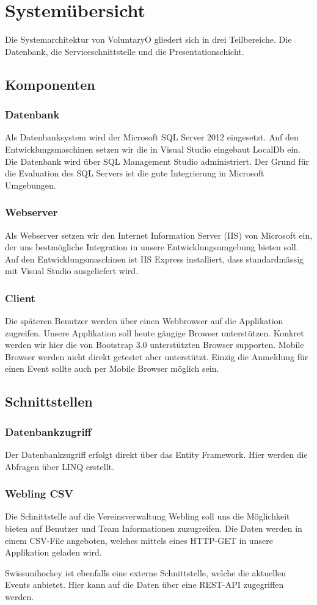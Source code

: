 \chapter{Systemübersicht}
	Die Systemarchitektur von VoluntaryO gliedert sich in drei Teilbereiche. Die Datenbank, die Serviceschnittstelle und die Presentationschicht.
	\section{Komponenten}
		\subsection{Datenbank}
		Als Datenbanksystem wird der Microsoft SQL Server 2012 eingesetzt. Auf den Entwicklungsmaschinen setzen wir die in Visual Studio eingebaut LocalDb ein. Die Datenbank wird über SQL Management Studio administriert. Der Grund für die Evaluation des SQL Servers ist die gute Integrierung in Microsoft Umgebungen.
		\subsection{Webserver}
		Als Webserver setzen wir den Internet Information Server (IIS) von Microsoft ein, der uns bestmögliche Integration in unsere Entwicklungsumgebung bieten soll. Auf den Entwicklungsmaschinen ist IIS Express installiert, dass standardmässig mit Visual Studio ausgeliefert wird.
		\subsection{Client}
		Die späteren Benutzer werden über einen Webbrowser auf die Applikation zugreifen. Unsere Applikation soll heute gängige Browser unterstützen. Konkret werden wir hier die von Bootstrap 3.0 unterstützten Browser supporten. Mobile Browser werden nicht direkt getestet aber unterstützt. Einzig die Anmeldung für einen Event sollte auch per Mobile Browser möglich sein.

	\section{Schnittstellen}
		\subsection{Datenbankzugriff}
		Der Datenbankzugriff erfolgt direkt über das Entity Framework. Hier werden die Abfragen über LINQ erstellt.

		\subsection{Webling CSV}
		Die Schnittstelle auf die Vereinsverwaltung Webling soll uns die Möglichkeit bieten auf Benutzer und Team Informationen zuzugreifen. Die Daten werden in einem CSV-File angeboten, welches mittels eines HTTP-GET in unsere Applikation geladen wird.

		Swissunihockey ist ebenfalls eine externe Schnittstelle, welche die aktuellen Events anbietet. Hier kann auf die Daten über eine REST-API zugegriffen werden.